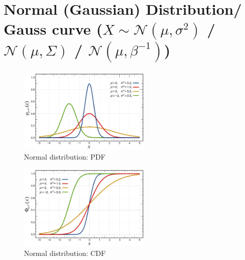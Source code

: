 \chapter{
Normal (Gaussian) Distribution/ Gauss curve 
($X \sim \mathcal{N}(\mu,\sigma^2)$
/ $\mathcal{N}(\mu, \Sigma)$ 
/ $\mathcal{N}(\mu, \beta^{-1})$) 
\cite{ism-1,mfml-1,wiki/Normal_distribution,dnn-deep-learning-ian}} \label{Normal (Gaussian) Distribution}

\begin{table}[H]
    \begin{minipage}{0.49\linewidth}
        \begin{figure}[H]
            \centering
            \includegraphics[width=\linewidth, height=4cm, keepaspectratio]{Pictures/distributions/Normal_Distribution_PDF.jpg}
            \caption{Normal distribution: PDF}
        \end{figure}
    \end{minipage}
    \hfill
    \begin{minipage}{0.49\linewidth}
        \begin{figure}[H]
            \centering
            \includegraphics[width=\linewidth, height=4cm, keepaspectratio]{Pictures/distributions/Normal_Distribution_CDF.jpg}
            \caption{Normal distribution: CDF}
        \end{figure}
    \end{minipage}
\end{table}


